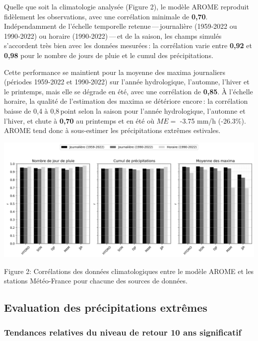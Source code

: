 \documentclass[
  article,
  nofooter,
  noheadings]{jss}
\begin{document}
Quelle que soit la climatologie analysée (Figure 2), le modèle AROME
reproduit fidèlement les observations, avec une corrélation minimale de
\textbf{0,70}. Indépendamment de l'échelle temporelle
retenue\,---\,journalière (1959‑2022 ou 1990‑2022) ou horaire
(1990‑2022)\,---\,et de la saison, les champs simulés s'accordent très
bien avec les données mesurées\,: la corrélation varie entre
\textbf{0,92} et \textbf{0,98} pour le nombre de jours de pluie et le
cumul des précipitations.

Cette performance se maintient pour la moyenne des maxima journaliers
(périodes 1959‑2022 et 1990‑2022) sur l'année hydrologique, l'automne,
l'hiver et le printemps, mais elle se dégrade en été, avec une
corrélation de \textbf{0,85}. À l'échelle horaire, la qualité de
l'estimation des maxima se détériore encore\,: la corrélation baisse de
0,4 à 0,8\,point selon la saison pour l'année hydrologique, l'automne et
l'hiver, et chute à \textbf{0,70} au printemps et en été où \(ME =\)
-3.75 mm/h (-26.3\%). AROME tend donc à sous-estimer les précipitations
extrêmes estivales.

\includegraphics[width=1\linewidth,height=\textheight,keepaspectratio]{figures/histo_numday_mean_mean-max.png}

\begin{center}
Figure 2: Corrélations des données climatologiques entre le modèle AROME et les stations Météo-France pour chacune des sources de données.
\end{center}

\subsection{Evaluation des précipitations
extrêmes}\label{evaluation-des-pruxe9cipitations-extruxeames}

\subsubsection{Tendances relatives du niveau de retour 10 ans
significatif}\label{tendances-relatives-du-niveau-de-retour-10-ans-significatif}
\end{document}
